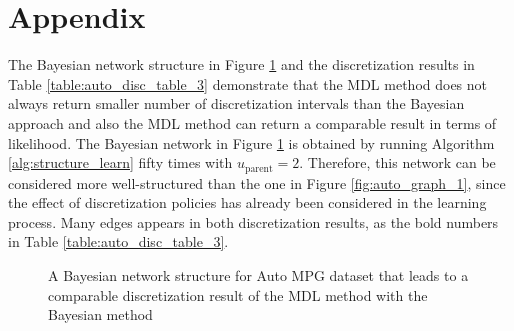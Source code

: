 





\section*{Appendix}
\label{sec:appendix}

The Bayesian network structure in Figure \ref{fig:auto_graph_3} and the discretization results in Table \ref{table:auto_disc_table_3} demonstrate that the MDL method does not always return smaller number of discretization intervals than the Bayesian approach and also the MDL method can return a comparable result in terms of likelihood. The Bayesian network in Figure \ref{fig:auto_graph_3} is obtained by running Algorithm \ref{alg:structure_learn} fifty times with $u_{\text{parent}} = 2$. Therefore, this network can be considered more well-structured than the one in Figure \ref{fig:auto_graph_1}, since the effect of discretization policies has already been considered in the learning process.
Many edges appears in both discretization results, as the bold numbers in Table \ref{table:auto_disc_table_3}. 
\begin{figure}[ht]
  \centering
  \scalebox{0.8}{
   }
   \caption{A Bayesian network structure for Auto MPG dataset that leads to a comparable discretization result of the MDL method with the Bayesian method}
  \label{fig:auto_graph_3}
\end{figure}

\begin{table}[h]
  \centering
  \caption{
    Results from discretization of the Auto MPG dataset with fixed structure from Figure~\ref{fig:auto_graph_3}.
    The first five rows list the discretization edges for each continuous variable.
    The last row lists the mean cross-validated log-likelihood.
    Two methods have same discretization result on variable $A$.
    Log-likelihood shows that the MDL method is just slightly worse than the Bayesian method.
  }

  \label{table:auto_disc_table_3}
\end{table}


